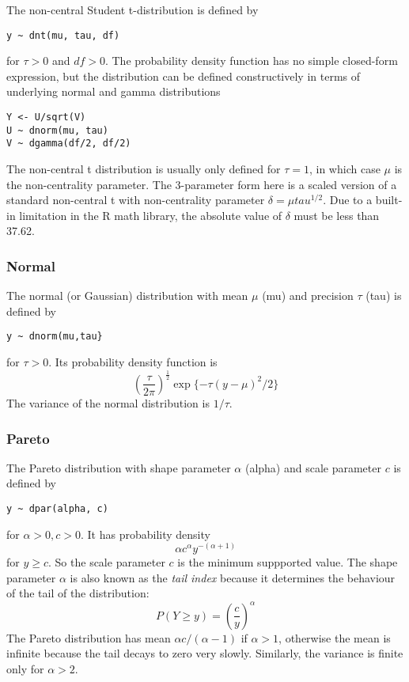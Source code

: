 \documentclass[11pt, a4paper, titlepage]{report}
\begin{document}
The non-central Student t-distribution is defined by
\begin{verbatim}
y ~ dnt(mu, tau, df)
\end{verbatim}
for $\tau > 0$ and $df > 0$. The probability density function has
no simple closed-form expression, but the distribution can be defined
constructively in terms of underlying normal and gamma distributions
\begin{verbatim}
Y <- U/sqrt(V)
U ~ dnorm(mu, tau)
V ~ dgamma(df/2, df/2)
\end{verbatim}
The non-central t distribution is usually only defined for $\tau = 1$,
in which case $\mu$ is the non-centrality parameter. The 3-parameter
form here is a scaled version of a standard non-central t with
non-centrality parameter $\delta = \mu tau^{1/2}$. Due to a built-in
limitation in the R math library, the absolute value of $\delta$ must
be less than 37.62.

\subsubsection{Normal}
\label{bugs:dnorm}

The normal (or Gaussian) distribution with mean $\mu$ (mu) and precision
$\tau$ (tau) is defined by
\begin{verbatim}
y ~ dnorm(mu,tau}
\end{verbatim}
for $\tau > 0$. Its probability density function is
\[
\left(\frac{\tau}{2\pi}\right)^{\frac{1}{2}} \exp\{- \tau (y - \mu)^2 / 2\}
\]
The variance of the normal distribution is $1/\tau$.

\subsubsection{Pareto}
\label{bugs:pareto}

The Pareto distribution with shape parameter $\alpha$ (alpha) and scale
parameter $c$ is defined by
\begin{verbatim}
y ~ dpar(alpha, c)
\end{verbatim}
for $\alpha > 0, c > 0$. It has probability density
\[
\alpha c^{\alpha} y^{-(\alpha + 1)}
\]
for $y \geq c$. So the scale parameter $c$ is the minimum suppported
value.  The shape parameter $\alpha$ is also known as the {\em tail
  index} because it determines the behaviour of the tail of the
distribution:
\[
P(Y \geq y) = \left( \frac{c}{y} \right)^\alpha
\]
The Pareto distribution has mean $\alpha c/(\alpha-1)$ if $\alpha >
1$, otherwise the mean is infinite because the tail decays to zero
very slowly. Similarly, the variance is finite only for $\alpha > 2$.
\end{document}
